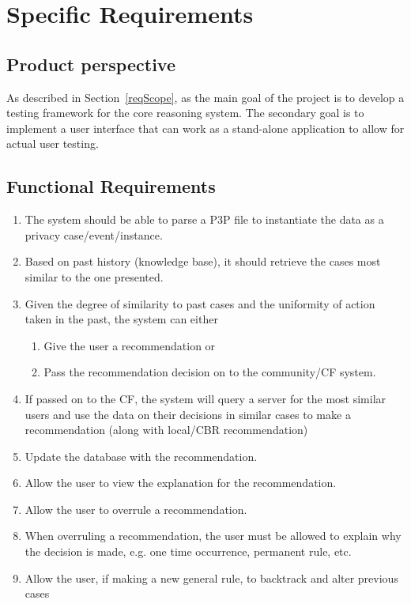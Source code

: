 \section{Specific Requirements}\label{specRec}

\subsection{Product perspective}
As described in Section~\ref{reqScope}, as the main goal of the project is to develop a testing framework for the core reasoning system. The secondary goal is to implement a user interface that can work as a stand-alone application to allow for actual user testing.

\subsection{Functional Requirements}\label{funcRequirements}
\begin{enumerate}
\item The system should be able to parse a P3P file to instantiate the data as a privacy case/event/instance.
\item Based on past history (knowledge base), it should retrieve the cases most similar to the one presented.
\item Given the degree of similarity to past cases and the uniformity of action taken in the past, the system can either 
  \begin{enumerate}
  \item Give the user a recommendation or 
  \item Pass the recommendation decision on to the community/CF system.
  \end{enumerate}
\item If passed on to the CF, the system will query a server for the most similar users and use the data on their decisions in similar cases to make a recommendation (along with local/CBR recommendation) 
\item Update the database with the recommendation.
\item Allow the user to view the explanation for the recommendation.
\item Allow the user to overrule a recommendation. 
\item When overruling a recommendation, the user must be allowed to explain why the decision is made, e.g. one time occurrence, permanent rule, etc.	
\item Allow the user, if making a new general rule, to backtrack and alter previous cases
\end{enumerate}

